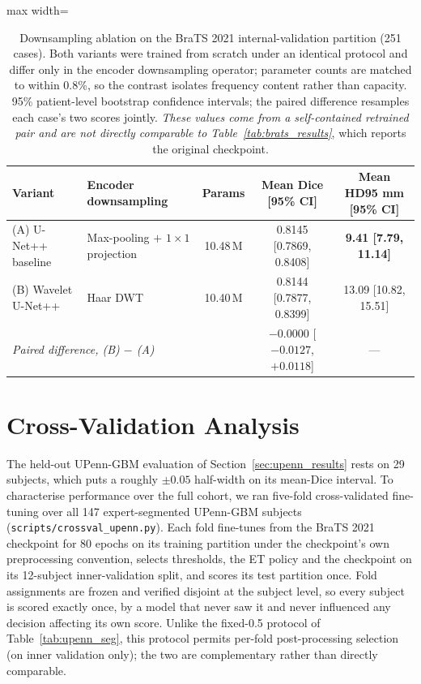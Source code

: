 \documentclass[conference]{IEEEtran}
\begin{document}
\begin{table}[!t]
\centering
\caption{Downsampling ablation on the BraTS 2021 internal-validation partition (251 cases). Both variants were trained from scratch under an identical protocol and differ only in the encoder downsampling operator; parameter counts are matched to within 0.8\%, so the contrast isolates frequency content rather than capacity. 95\% patient-level bootstrap confidence intervals; the paired difference resamples each case's two scores jointly. \emph{These values come from a self-contained retrained pair and are not directly comparable to Table~\ref{tab:brats_results}}, which reports the original checkpoint.}
\label{tab:ablation}
\begin{adjustbox}{max width=\columnwidth}
\begin{tabular}{llccc}
\toprule
\textbf{Variant} & \textbf{Encoder downsampling} & \textbf{Params} & \textbf{Mean Dice [95\% CI]} & \textbf{Mean HD95 mm [95\% CI]} \\
\midrule
(A) U-Net++ baseline & Max-pooling $+$ $1\times1$ projection & 10.48\,M & 0.8145 [0.7869, 0.8408] & \textbf{9.41 [7.79, 11.14]} \\
(B) Wavelet U-Net++  & Haar DWT                              & 10.40\,M & 0.8144 [0.7877, 0.8399] & 13.09 [10.82, 15.51] \\
\midrule
\multicolumn{3}{l}{\emph{Paired difference, (B) $-$ (A)}} & $-0.0000$ [$-0.0127$, $+0.0118$] & --- \\
\bottomrule
\end{tabular}
\end{adjustbox}
\end{table}

\section{Cross-Validation Analysis}
\label{sec:crossval}

The held-out UPenn-GBM evaluation of Section~\ref{sec:upenn_results} rests on 29 subjects, which puts a roughly $\pm0.05$ half-width on its mean-Dice interval. To characterise performance over the full cohort, we ran five-fold cross-validated fine-tuning over all 147 expert-segmented UPenn-GBM subjects (\texttt{scripts/crossval\_upenn.py}). Each fold fine-tunes from the BraTS 2021 checkpoint for 80 epochs on its training partition under the checkpoint's own preprocessing convention, selects thresholds, the ET policy and the checkpoint on its 12-subject inner-validation split, and scores its test partition once. Fold assignments are frozen and verified disjoint at the subject level, so every subject is scored exactly once, by a model that never saw it and never influenced any decision affecting its own score. Unlike the fixed-0.5 protocol of Table~\ref{tab:upenn_seg}, this protocol permits per-fold post-processing selection (on inner validation only); the two are complementary rather than directly comparable.
\end{document}
